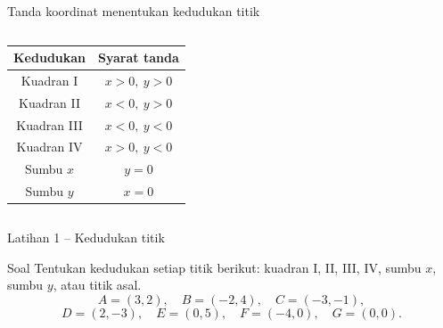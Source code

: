 \documentclass[aspectratio=169,11pt]{beamer}
\newcommand{\axisgrid}[4]{%
    \draw[step=1cm,gray!20,very thin] (#1,#3) grid (#2,#4);
    \draw[-{Latex[length=2mm]},AcademicBlue,thick] (#1,0)--({#2+0.25},0) node[right] {$x$};
    \draw[-{Latex[length=2mm]},AcademicBlue,thick] (0,#3)--(0,{#4+0.25}) node[above] {$y$};
}
\begin{document}
\begin{frame}{Tanda koordinat menentukan kedudukan titik}
    \begin{columns}[c]
        \centering

        \renewcommand{\arraystretch}{1.20}
        \begin{tabular}{c@{\qquad}c}
            \toprule
            Kedudukan & Syarat tanda\\
            \midrule
            Kuadran I   & $x>0,\ y>0$\\
            Kuadran II  & $x<0,\ y>0$\\
            Kuadran III & $x<0,\ y<0$\\
            Kuadran IV  & $x>0,\ y<0$\\
            Sumbu $x$   & $y=0$\\
            Sumbu $y$   & $x=0$\\
            \bottomrule
        \end{tabular}
    \end{columns}
    
\end{frame}


\begin{frame}{Latihan 1 -- Kedudukan titik}
    \begin{block}{Soal}
        Tentukan kedudukan setiap titik berikut: kuadran I, II, III, IV,
        sumbu $x$, sumbu $y$, atau titik asal.
        \[
            A=(3,2),\quad B=(-2,4),\quad C=(-3,-1),
        \]
        \[
            D=(2,-3),\quad E=(0,5),\quad F=(-4,0),\quad G=(0,0).
        \]
    \end{block}
    \vspace{0.35cm}
    \centering
\end{frame}
\end{document}
